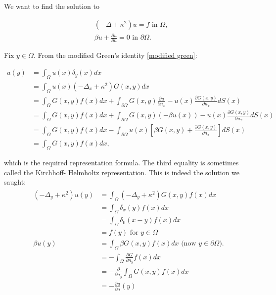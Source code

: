 \documentclass[paper=a4, fontsize=11pt]{scrartcl} %
\numberwithin{equation}{section} %
\numberwithin{figure}{section} %
\numberwithin{table}{section} %
\begin{document}
We want to find the solution to

\begin{align*}
  &(-\Delta + \kappa^2 ) u = f \text{ in } \Omega, \\
  &\beta u + \frac{\partial u}{\partial n}=0  \text{ in } \partial \Omega. 
\end{align*}

Fix $y\in \Omega$. From the modified Green's identity \ref{modified green}:

\begin{align*}
    u(y) &= \int_{\Omega} u(x) \delta_y(x) dx \\
    &= \int_{\Omega}  u(x)(-\Delta_{x} +\kappa^2 )G(x,y) dx \\
    & = \int_{\Omega} G(x,y) f(x) dx + \int_{\partial\Omega} G(x,y) \frac{\partial u}{\partial n_{x}} - u(x) \frac{\partial G(x,y)}{\partial n_{x}} dS(x) \\
    & = \int_{\Omega} G(x,y) f(x) dx + \int_{\partial\Omega}   G(x,y) (-\beta u(x)) - u(x) \frac{\partial G(x,y)}{\partial n_{x}} dS(x) \\
    & = \int_{\Omega} G(x,y) f(x) dx - \int_{\partial\Omega} u(x) [ \beta  G(x,y)  + \frac{\partial G(x,y)}{\partial n_{x}} ] dS(x) \\
    & = \int_{\Omega} G(x,y) f(x) dx,
\end{align*}

which is the required representation formula. The third equality is sometimes called the Kirchhoff- Helmholtz representation.
This is indeed the solution we saught: 
\begin{align}
  \begin{split}
    (-\Delta_{y} + \kappa^2 ) u(y) &= \int_{\Omega} (-\Delta_{y} +\kappa^2 )G(x,y)f(x)dx \\
    & = \int_{\Omega} \delta_{x}(y) f(x)dx \\
    & = \int_{\Omega} \delta_{0}(x-y) f(x)dx \\ 
    & = f(y) \text{ for } y \in \Omega\\
    \beta u(y) & =\int_{\Omega}  \beta G(x,y)f(x)dx \text{ (now } y\in \partial \Omega).\\
    & =- \int_{\Omega} \frac{\partial G}{\partial n_{y}}f(x)dx \\
    & =- \frac{\partial}{\partial n_{y}}  \int_{\Omega} G(x,y)f(x)dx \\
    & =- \frac{\partial u} {\partial n}(y) 
  \end{split}
\end{align}
\end{document}
